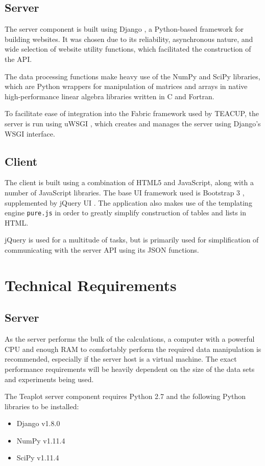 \documentclass[a4paper,twocolumn,english,11pt, a4paper, conference]{IEEEtran}
\begin{document}
\subsection{Server}
The server component is built using Django \cite{django}, a Python-based framework for building websites. It was chosen due to its reliability, asynchronous nature, and wide selection of website utility functions, which facilitated the construction of the API.

The data processing functions make heavy use of the NumPy \cite{numpy} and SciPy \cite{scipy} libraries, which are Python wrappers for manipulation of matrices and arrays in native high-performance linear algebra libraries written in C and Fortran.

To facilitate ease of integration into the Fabric framework used by TEACUP, the server is run using uWSGI \cite{uwsgi}, which creates and manages the server using Django's WSGI interface. 
\subsection{Client}
The client is built using a combination of HTML5 and JavaScript, along with a number of JavaScript libraries. The base UI framework used is Bootstrap 3 \cite{bootstrap}, supplemented by jQuery UI \cite{jquery-ui}. The application also makes use of the templating engine \texttt{pure.js} in order to greatly simplify construction of tables and lists in HTML. 

jQuery \cite{jquery} is used for a multitude of tasks, but is primarily used for simplification of communicating with the server API using its JSON functions. 
\section{Technical Requirements}
\label{sect:requirements}
\subsection{Server}
As the server performs the bulk of the calculations, a computer with a powerful CPU and enough RAM to comfortably perform the required data manipulation is recommended, especially if the server host is a virtual machine. The exact performance requirements will be heavily dependent on the size of the data sets and experiments being used. 

The Teaplot server component requires Python 2.7 and the following Python libraries to be installed:
\begin{itemize}
	\item Django v1.8.0 
	\item NumPy v1.11.4 
	\item SciPy v1.11.4 
\end{itemize}
\end{document}
